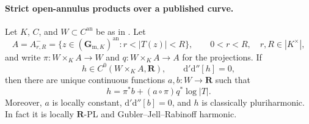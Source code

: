 \paragraph{Strict open-annulus products over a published curve.}
\begin{theorem}
\label{thm:p062-open-annulus-products-over-curves}
Let \(K\), \(C\), and \(W\subset C^{\mathrm{an}}\) be as in
.  Let
\[
 A=A^-_{r,R}=
 \{z\in(\mathbf G_{\mathrm m,K})^{\mathrm{an}}:r<|T(z)|<R\},
 \qquad 0<r<R,\quad r,R\in|K^\times|,
\]
and write \(\pi:W\times_KA\to W\) and \(q:W\times_KA\to A\) for
the projections.  If
\[
 h\in C^0(W\times_KA,\mathbf R),
 \qquad \mathrm d'\mathrm d''[h]=0,
\]
then there are unique continuous functions \(a,b:W\to\mathbf R\) such
that
\[
 h=\pi^*b+(a\circ\pi)q^*\log|T|.
\]
Moreover, \(a\) is locally constant, \(\mathrm d'\mathrm d''[b]=0\),
and \(h\) is classically pluriharmonic.  In fact it is locally
\(\mathbf R\)-PL and Gubler--Jell--Rabinoff harmonic.
\end{theorem}

